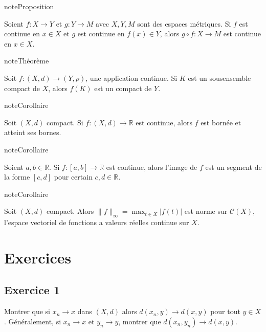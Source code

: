 \documentclass[letterpaper,10pt,french]{sphinxmanual}
\begin{document}
\begin{sphinxadmonition}{note}{Proposition}

\sphinxAtStartPar
Soient \(f : X \to Y\) et \(g : Y \to M\) avec \(X, Y, M\) sont des espaces métriques. Si \(f\) est continue en \(x\in X\) et \(g\) est continue en \(f(x)\in Y\), alors \(g\circ f: X \to M\) est continue en \(x\in X\).
\end{sphinxadmonition}

\begin{sphinxadmonition}{note}{Théorème}

\sphinxAtStartPar
Soit \(f : (X, d) \to (Y, \rho)\), une application continue. Si \(K\) est un sous\sphinxhyphen{}ensemble compact de \(X\), alors \(f(K)\) est un compact de \(Y\).
\end{sphinxadmonition}

\begin{sphinxadmonition}{note}{Corollaire}

\sphinxAtStartPar
Soit \((X, d)\) compact. Si \(f : (X, d) \to \mathbb R\) est continue, alors \(f\) est bornée et atteint ses bornes.
\end{sphinxadmonition}

\begin{sphinxadmonition}{note}{Corollaire}

\sphinxAtStartPar
Soient \(a, b \in \mathbb R\). Si \(f : [a, b] \to \mathbb R\) est continue, alors l’image de \(f\) est un segment de la forme \([c, d]\) pour certain \(c, d \in \mathbb R\).
\end{sphinxadmonition}

\begin{sphinxadmonition}{note}{Corollaire}

\sphinxAtStartPar
Soit \((X, d)\) compact. Alors \(\|f\|_\infty = \max_{t\in X} |f(t)|\) est norme sur \(\mathcal C(X)\), l’espace vectoriel de fonctions a valeurs réelles continue sur \(X\).
\end{sphinxadmonition}


\section{Exercices}
\label{\detokenize{exo_fctplsvar:exercices}}\label{\detokenize{exo_fctplsvar::doc}}

\subsection{Exercice 1}
\label{\detokenize{exo_fctplsvar:exercice-1}}
\sphinxAtStartPar
Montrer que si \(x_n \to x\) dans \((X, d)\) alors \(d(x_n,y) \to d(x,y)\) pour tout \(y\in X\). Généralement, si \(x_n \to x\) et \(y_n \to y\), montrer que \(d(x_n,y_n) \to d(x,y)\).
\end{document}
